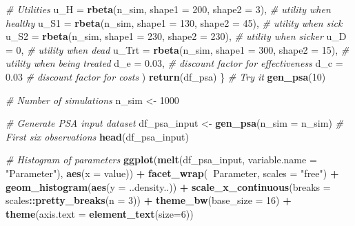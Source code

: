 \documentclass[]{article}
\newenvironment{Shaded}{\begin{snugshade}}{\end{snugshade}}
\newcommand{\KeywordTok}[1]{\textcolor[rgb]{0.13,0.29,0.53}{\textbf{#1}}}
\newcommand{\DataTypeTok}[1]{\textcolor[rgb]{0.13,0.29,0.53}{#1}}
\newcommand{\DecValTok}[1]{\textcolor[rgb]{0.00,0.00,0.81}{#1}}
\newcommand{\FloatTok}[1]{\textcolor[rgb]{0.00,0.00,0.81}{#1}}
\newcommand{\StringTok}[1]{\textcolor[rgb]{0.31,0.60,0.02}{#1}}
\newcommand{\CommentTok}[1]{\textcolor[rgb]{0.56,0.35,0.01}{\textit{#1}}}
\newcommand{\OperatorTok}[1]{\textcolor[rgb]{0.81,0.36,0.00}{\textbf{#1}}}
\newcommand{\NormalTok}[1]{#1}
\begin{document}
\begin{Shaded}
\begin{Highlighting}[]
    \CommentTok{# Utilities}
    \DataTypeTok{u_H   =} \KeywordTok{rbeta}\NormalTok{(n_sim, }\DataTypeTok{shape1 =} \DecValTok{200}\NormalTok{, }\DataTypeTok{shape2 =} \DecValTok{3}\NormalTok{),     }\CommentTok{# utility when healthy}
    \DataTypeTok{u_S1  =} \KeywordTok{rbeta}\NormalTok{(n_sim, }\DataTypeTok{shape1 =} \DecValTok{130}\NormalTok{, }\DataTypeTok{shape2 =} \DecValTok{45}\NormalTok{),    }\CommentTok{# utility when sick}
    \DataTypeTok{u_S2  =} \KeywordTok{rbeta}\NormalTok{(n_sim, }\DataTypeTok{shape1 =} \DecValTok{230}\NormalTok{, }\DataTypeTok{shape2 =} \DecValTok{230}\NormalTok{),   }\CommentTok{# utility when sicker}
    \DataTypeTok{u_D   =} \DecValTok{0}\NormalTok{,                                          }\CommentTok{# utility when dead}
    \DataTypeTok{u_Trt =} \KeywordTok{rbeta}\NormalTok{(n_sim, }\DataTypeTok{shape1 =} \DecValTok{300}\NormalTok{, }\DataTypeTok{shape2 =} \DecValTok{15}\NormalTok{),    }\CommentTok{# utility when being treated}
    \DataTypeTok{d_e   =} \FloatTok{0.03}\NormalTok{,                                       }\CommentTok{# discount factor for effectiveness}
    \DataTypeTok{d_c   =} \FloatTok{0.03}                                        \CommentTok{# discount factor for costs}
\NormalTok{  )}
    \KeywordTok{return}\NormalTok{(df_psa)}
\NormalTok{\}}
\CommentTok{# Try it}
\KeywordTok{gen_psa}\NormalTok{(}\DecValTok{10}\NormalTok{) }

\CommentTok{# Number of simulations}
\NormalTok{n_sim <-}\StringTok{ }\DecValTok{1000}

\CommentTok{# Generate PSA input dataset}
\NormalTok{df_psa_input <-}\StringTok{ }\KeywordTok{gen_psa}\NormalTok{(}\DataTypeTok{n_sim =}\NormalTok{ n_sim)}
\CommentTok{# First six observations}
\KeywordTok{head}\NormalTok{(df_psa_input)}

\CommentTok{# Histogram of parameters}
\KeywordTok{ggplot}\NormalTok{(}\KeywordTok{melt}\NormalTok{(df_psa_input, }\DataTypeTok{variable.name =} \StringTok{"Parameter"}\NormalTok{), }\KeywordTok{aes}\NormalTok{(}\DataTypeTok{x =}\NormalTok{ value)) }\OperatorTok{+}
\StringTok{       }\KeywordTok{facet_wrap}\NormalTok{(}\OperatorTok{~}\NormalTok{Parameter, }\DataTypeTok{scales =} \StringTok{"free"}\NormalTok{) }\OperatorTok{+}
\StringTok{       }\KeywordTok{geom_histogram}\NormalTok{(}\KeywordTok{aes}\NormalTok{(}\DataTypeTok{y =}\NormalTok{ ..density..)) }\OperatorTok{+}
\StringTok{       }\KeywordTok{scale_x_continuous}\NormalTok{(}\DataTypeTok{breaks =}\NormalTok{ scales}\OperatorTok{::}\KeywordTok{pretty_breaks}\NormalTok{(}\DataTypeTok{n =} \DecValTok{3}\NormalTok{)) }\OperatorTok{+}\StringTok{ }
\StringTok{       }\KeywordTok{theme_bw}\NormalTok{(}\DataTypeTok{base_size =} \DecValTok{16}\NormalTok{) }\OperatorTok{+}\StringTok{ }
\StringTok{       }\KeywordTok{theme}\NormalTok{(}\DataTypeTok{axis.text =} \KeywordTok{element_text}\NormalTok{(}\DataTypeTok{size=}\DecValTok{6}\NormalTok{)) }


\end{Highlighting}
\end{Shaded}
\end{document}
